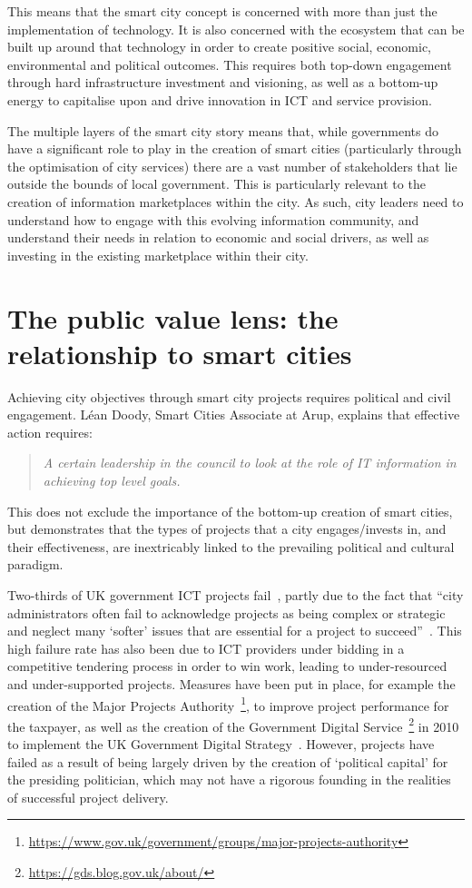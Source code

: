 \documentclass[conference]{IEEEtran}
\begin{document}
This means that the smart city concept is concerned with more than
just the implementation of technology. It is also concerned with the
ecosystem that can be built up around that technology in order to
create positive social, economic, environmental and political
outcomes. This requires both top-down engagement through hard
infrastructure investment and visioning, as well as a bottom-up energy
to capitalise upon and drive innovation in ICT and service provision.
 
The multiple layers of the smart city story means that, while
governments do have a significant role to play in the creation of
smart cities (particularly through the optimisation of city services)
there are a vast number of stakeholders that lie outside the bounds of
local government. This is particularly relevant to the creation of
information marketplaces within the city. As such, city leaders need
to understand how to engage with this evolving information community,
and understand their needs in relation to economic and social drivers,
as well as investing in the existing marketplace within their city.


\section{The public value lens: the relationship to smart cities}
Achieving city objectives through smart city projects requires
political and civil engagement. L\'{e}an Doody, Smart Cities Associate at
Arup, explains that effective action requires:

\begin{quote}
{\emph{A certain leadership in the council to look at the role of IT
information in achieving top level goals.}}~\cite{doody:2012}
\end{quote}

This does not exclude the importance of the bottom-up creation of
smart cities, but demonstrates that the types of projects that a city
engages/invests in, and their effectiveness, are inextricably linked
to the prevailing political and cultural paradigm.

Two-thirds of UK government ICT projects fail~\cite{postitp:2003},
partly due to the fact that ``city administrators often fail to
acknowledge projects as being complex or strategic and neglect many
`softer' issues that are essential for a project to
succeed''~\cite{arup-et-al:2011}. This high failure rate has also been
due to ICT providers under bidding in a competitive tendering process
in order to win work, leading to under-resourced and under-supported
projects. Measures have been put in place, for example the creation of
the Major Projects
Authority~\footnote{\url{https://www.gov.uk/government/groups/major-projects-authority}},
to improve project performance for the taxpayer, as well as the
creation of the Government Digital
Service~\footnote{\url{https://gds.blog.gov.uk/about/}} in 2010 to
implement the UK Government Digital
Strategy~\cite{ukgds:2013}. However, projects have failed as a result
of being largely driven by the creation of `political capital' for the
presiding politician, which may not have a rigorous founding in the
realities of successful project delivery.
\end{document}
